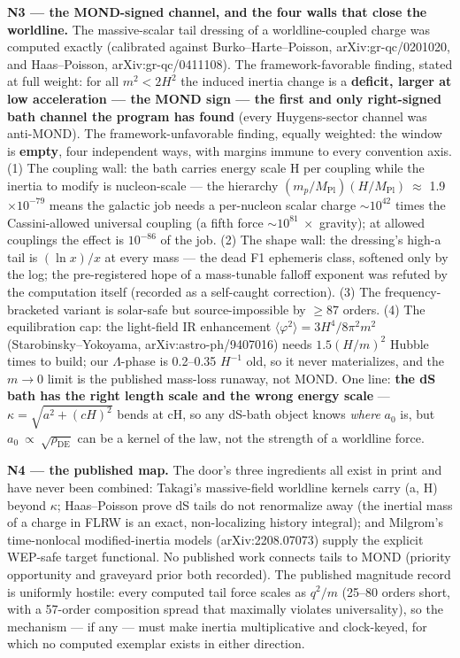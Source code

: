 \documentclass[11pt,a4paper]{article}
\begin{document}
\textbf{N3 --- the MOND-signed channel, and the four walls that close the worldline.} The massive-scalar tail dressing of a worldline-coupled charge was computed exactly (calibrated against Burko--Harte--Poisson, arXiv:gr-qc/0201020, and Haas--Poisson, arXiv:gr-qc/0411108). The framework-favorable finding, stated at full weight: for all $m^2 < 2H^2$ the induced inertia change is a \textbf{deficit, larger at low acceleration --- the MOND sign --- the first and only right-signed bath channel the program has found} (every Huygens-sector channel was anti-MOND). The framework-unfavorable finding, equally weighted: the window is \textbf{empty}, four independent ways, with margins immune to every convention axis. (1) The coupling wall: the bath carries energy scale H per coupling while the inertia to modify is nucleon-scale --- the hierarchy $(m_p/M_{\mathrm{Pl}})(H/M_{\mathrm{Pl}})\ \approx$ 1.9$\times10^{-79}$ means the galactic job needs a per-nucleon scalar charge $\sim{}10^{42}$ times the Cassini-allowed universal coupling (a fifth force $\sim{}10^{81}\ \times$ gravity); at allowed couplings the effect is $10^{-86}$ of the job. (2) The shape wall: the dressing's high-a tail is $(\ln x)/x$ at every mass --- the dead F1 ephemeris class, softened only by the log; the pre-registered hope of a mass-tunable falloff exponent was refuted by the computation itself (recorded as a self-caught correction). (3) The frequency-bracketed variant is solar-safe but source-impossible by $\ge$87 orders. (4) The equilibration cap: the light-field IR enhancement $\langle\varphi^2\rangle = 3H^4/8\pi^2m^2$ (Starobinsky--Yokoyama, arXiv:astro-ph/9407016) needs $1.5(H/m)^2$ Hubble times to build; our $\Lambda$-phase is 0.2--0.35 $H^{-1}$ old, so it never materializes, and the $m \to 0$ limit is the published mass-loss runaway, not MOND. One line: \textbf{the dS bath has the right length scale and the wrong energy scale} --- $\kappa = \sqrt{a^2+(cH)^2}$ bends at cH, so any dS-bath object knows \emph{where} $a_{0}$ is, but $a_{0}\ \propto\ \sqrt{\rho_{\mathrm{DE}}}$ can be a kernel of the law, not the strength of a worldline force.

\textbf{N4 --- the published map.} The door's three ingredients all exist in print and have never been combined: Takagi's massive-field worldline kernels carry (a, H) beyond $\kappa$; Haas--Poisson prove dS tails do not renormalize away (the inertial mass of a charge in FLRW is an exact, non-localizing history integral); and Milgrom's time-nonlocal modified-inertia models (arXiv:2208.07073) supply the explicit WEP-safe target functional. No published work connects tails to MOND (priority opportunity and graveyard prior both recorded). The published magnitude record is uniformly hostile: every computed tail force scales as $q^2/m$ (25--80 orders short, with a 57-order composition spread that maximally violates universality), so the mechanism --- if any --- must make inertia multiplicative and clock-keyed, for which no computed exemplar exists in either direction.
\end{document}
